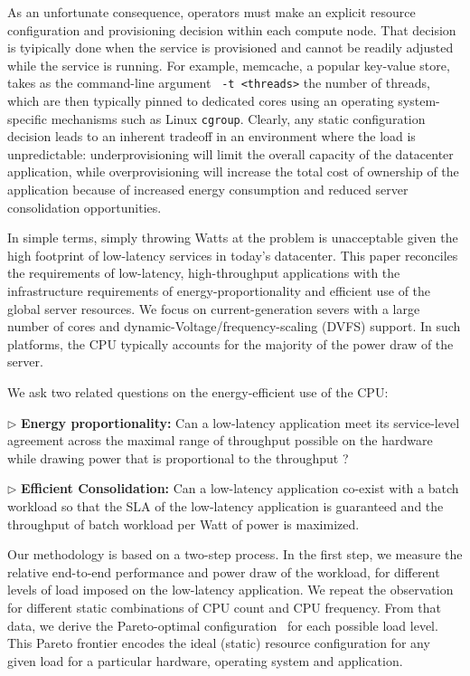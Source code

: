 As an unfortunate consequence, operators must make an explicit
resource configuration and provisioning decision within each compute
node.  That decision is tyipically done when the service is
provisioned and cannot be readily adjusted while the service is
running.  For example, memcache, a popular key-value store, takes as
the command-line argument \texttt{ -t <threads>} the number of
threads, which are then typically pinned to dedicated cores using an
operating system-specific mechanisms such as Linux \texttt{cgroup}.
Clearly, any static configuration decision leads to an inherent
tradeoff in an environment where the load is unpredictable:
underprovisioning will limit the overall capacity of the datacenter
application, while overprovisioning will increase the total cost of
ownership of the application because of increased energy consumption
and reduced server consolidation opportunities.

In simple terms, simply throwing Watts at the problem is unacceptable
given the high footprint of low-latency services in today's
datacenter.  This paper reconciles the requirements of low-latency,
high-throughput applications with the infrastructure requirements of
energy-proportionality and efficient use of the global server
resources.  We focus on current-generation severs with a large number
of cores and dynamic-Voltage/frequency-scaling (DVFS) support.  In
such platforms, the CPU typically accounts for the majority of the
power draw of the server.  


We ask two related questions on the  energy-efficient use of the CPU:

$\triangleright$ {\bf Energy proportionality:} Can a low-latency
application meet its service-level agreement across the maximal range
of throughput possible on the hardware while drawing power that is
proportional to the throughput ? 

$\triangleright$ {\bf Efficient Consolidation:} Can a low-latency application
co-exist with a batch workload so that the SLA of the low-latency
application is guaranteed and the throughput of batch workload per
Watt of power is maximized.


Our methodology is based on a two-step process.  In the first step, we
measure the relative end-to-end performance and power draw of the
workload, for different levels of load imposed on the low-latency
application.  We repeat the observation for different static
combinations of CPU count and CPU frequency.  From that data, we
derive the Pareto-optimal configuration~\cite{missing} for each
possible load level.  
This Pareto frontier encodes the ideal (static) resource configuration
for any given load for a particular hardware, operating system and
application. 


